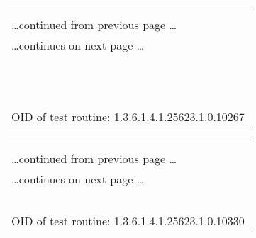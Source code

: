 \documentclass{article}
\begin{document}
\begin{longtable}{|p{}|}
\hline
\rowcolor{openvas_log}{\color{white}{Log (CVSS: 0.0) }}\\
\rowcolor{openvas_log}{\color{white}{NVT: SSH Server type and version}}\\
\hline
\endfirsthead
\hfill\ldots continued from previous page \ldots \\
\hline
\endhead
\hline
\ldots continues on next page \ldots \\
\endfoot
\hline
\endlastfoot
\\
\rowcolor{white}{\verb=Detected SSH server version: SSH-2.0-OpenSSH_5.3p1 Debian-3ubuntu7=}\\
\rowcolor{white}{\verb=Remote SSH supported authentication: publickey,password=}\\
\rowcolor{white}{\verb=Remote SSH banner: =}\\
\rowcolor{white}{\verb=(not available)=}\\
\rowcolor{white}{\verb=CPE: cpe:/a:openbsd:openssh:5.3p1=}\\
\rowcolor{white}{\verb=Concluded from remote connection attempt with credentials:=}\\
\rowcolor{white}{\verb=  Login: OpenVAS=}\\
\rowcolor{white}{\verb=  Password: OpenVAS=}\\
\rowcolor{white}{\verb==}\\
\rowcolor{white}{\verb==}\\
\\
OID of test routine: 1.3.6.1.4.1.25623.1.0.10267\\
\end{longtable}

\begin{longtable}{|p{}|}
\hline
\rowcolor{openvas_log}{\color{white}{Log (CVSS: 0.0) }}\\
\rowcolor{openvas_log}{\color{white}{NVT: Services}}\\
\hline
\endfirsthead
\hfill\ldots continued from previous page \ldots \\
\hline
\endhead
\hline
\ldots continues on next page \ldots \\
\endfoot
\hline
\endlastfoot
\\
\rowcolor{white}{\verb=An ssh server is running on this port=}\\
\rowcolor{white}{\verb==}\\
\rowcolor{white}{\verb==}\\
\\
OID of test routine: 1.3.6.1.4.1.25623.1.0.10330\\
\end{longtable}
\end{document}
